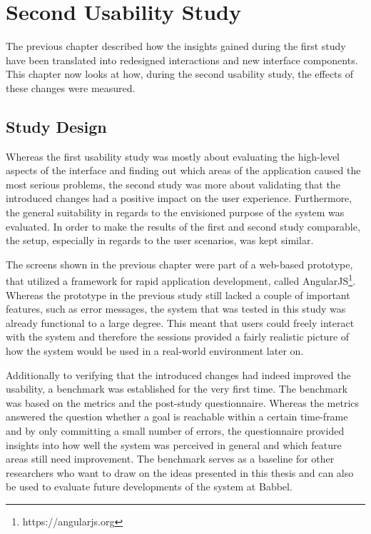 \chapter{Second Usability Study} \label{chapter:second-iteration}
The previous chapter described how the insights gained during the first study have been translated into redesigned interactions and new interface components. This chapter now looks at how, during the second usability study, the effects of these changes were measured.

\section{Study Design}
Whereas the first usability study was mostly about evaluating the high-level aspects of the interface and finding out which areas of the application caused the most serious problems, the second study was more about validating that the introduced changes had a positive impact on the user experience. Furthermore, the general suitability in regards to the envisioned purpose of the system was evaluated. In order to make the results of the first and second study comparable, the setup, especially in regards to the user scenarios, was kept similar.

The screens shown in the previous chapter were part of a web-based prototype, that utilized a framework for rapid application development, called AngularJS\footnote{https://angularjs.org}. Whereas the prototype in the previous study still lacked a couple of important features, such as error messages, the system that was tested in this study was already functional to a large degree. This meant that users could freely interact with the system and therefore the sessions provided a fairly realistic picture of how the system would be used in a real-world environment later on.

Additionally to verifying that the introduced changes had indeed improved the usability, a benchmark was established for the very first time. The benchmark was based on the metrics and the post-study questionnaire. Whereas the metrics answered the question whether a goal is reachable within a certain time-frame and by only committing a small number of errors, the questionnaire provided insights into how well the system was perceived in general and which feature areas still need improvement. The benchmark serves as a baseline for other researchers who want to draw on the ideas presented in this thesis and can also be used to evaluate future developments of the system at Babbel.

